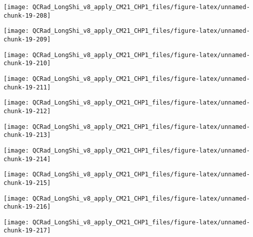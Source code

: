 \documentclass[
  10pt,
  a4paper,oneside]{article}
\begin{document}
\begin{center}\texttt{[image: QCRad\_LongShi\_v8\_apply\_CM21\_CHP1\_files/figure-latex/unnamed-chunk-19-208]} \end{center}

\begin{center}\texttt{[image: QCRad\_LongShi\_v8\_apply\_CM21\_CHP1\_files/figure-latex/unnamed-chunk-19-209]} \end{center}

\begin{center}\texttt{[image: QCRad\_LongShi\_v8\_apply\_CM21\_CHP1\_files/figure-latex/unnamed-chunk-19-210]} \end{center}

\begin{center}\texttt{[image: QCRad\_LongShi\_v8\_apply\_CM21\_CHP1\_files/figure-latex/unnamed-chunk-19-211]} \end{center}

\begin{center}\texttt{[image: QCRad\_LongShi\_v8\_apply\_CM21\_CHP1\_files/figure-latex/unnamed-chunk-19-212]} \end{center}

\begin{center}\texttt{[image: QCRad\_LongShi\_v8\_apply\_CM21\_CHP1\_files/figure-latex/unnamed-chunk-19-213]} \end{center}

\begin{center}\texttt{[image: QCRad\_LongShi\_v8\_apply\_CM21\_CHP1\_files/figure-latex/unnamed-chunk-19-214]} \end{center}

\begin{center}\texttt{[image: QCRad\_LongShi\_v8\_apply\_CM21\_CHP1\_files/figure-latex/unnamed-chunk-19-215]} \end{center}

\begin{center}\texttt{[image: QCRad\_LongShi\_v8\_apply\_CM21\_CHP1\_files/figure-latex/unnamed-chunk-19-216]} \end{center}

\begin{center}\texttt{[image: QCRad\_LongShi\_v8\_apply\_CM21\_CHP1\_files/figure-latex/unnamed-chunk-19-217]} \end{center}
\end{document}
